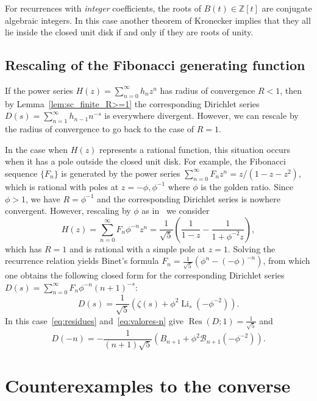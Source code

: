 \documentclass[11pt,a4paper]{amsart}
\newcommand{\Z}{\mathbb{Z}}
\newcommand{\AB}{\mathcal{B}}
\newcommand{\Li}{\operatorname{Li}}
\newcommand{\Res}{\operatorname{Res}}
\theoremstyle{plain}
\theoremstyle{plain}
\theoremstyle{plain}
\theoremstyle{definition}
\theoremstyle{remark}
\begin{document}
For recurrences with \emph{integer} coefficients, the roots of $B(t) \in \Z[t]$ are conjugate algebraic integers. In this case another theorem of Kronecker implies that they all lie inside the closed unit disk if and only if they are roots of unity.


\subsection{Rescaling of the Fibonacci generating function}
\label{subsec:Fibonacci}

If the power series $H(z) = \sum_{n=0}^{\infty} h_{n} z^{n}$ has radius of convergence $R < 1$, then by Lemma~\ref{lem:sc_finite_R>=1} the corresponding Dirichlet series $D(s) = \sum_{n=1}^{\infty} h_{n-1} n^{-s}$ is everywhere divergent. However, we can rescale by the radius of convergence to go back to the case of $R = 1$. 

In the case when $H(z)$ represents a rational function, this situation occurs when it has a pole outside the closed unit disk. For example, the Fibonacci sequence $\{F_{n}\}$ is generated by the power series $\sum_{n=0}^{\infty} F_{n} z^{n} = z/(1 - z - z^{2})$, which is rational with poles at $z = -\phi, \phi^{-1}$ where $\phi$ is the golden ratio. Since $\phi > 1$, we have $R = \phi^{-1}$ and the corresponding Dirichlet series is nowhere convergent. However, rescaling by $\phi$ as in~\cite{AppellSpecialValues} we consider
\[
  H(z) = \sum_{n=0}^{\infty} F_{n} \phi^{-n} z^{n}
  = \frac{1}{\sqrt{5}}\left(\frac{1}{1-z} - \frac{1}{1 + \phi^{-2}z}\right),
\]
which has $R = 1$ and is rational with a simple pole at $z=1$.
Solving the recurrence relation yields Binet's formula $F_{n} = \frac{1}{\sqrt{5}}(\phi^{n} - (-\phi)^{-n})$, from which one obtains the following closed form for the corresponding Dirichlet series $D(s) = \sum_{n=0}^{\infty} F_{n} \phi^{-n} (n + 1)^{-s}$:
\[
  D(s) = \frac{1}{\sqrt{5}}(\zeta(s) + \phi^{2}\Li_{s}(-\phi^{-2})).
\]
In this case~\eqref{eq:residues} and~\eqref{eq:valores-n} give $\Res(D;1) = \frac{1}{\sqrt{5}}$ and
\[
  D(-n) = -\frac{1}{(n+1)\sqrt{5}}(B_{n+1} + \phi^{2} \AB_{n+1}(-\phi^{-2})).
\]


\section{Counterexamples to the converse}
\label{sec:counterexamples}
\end{document}

